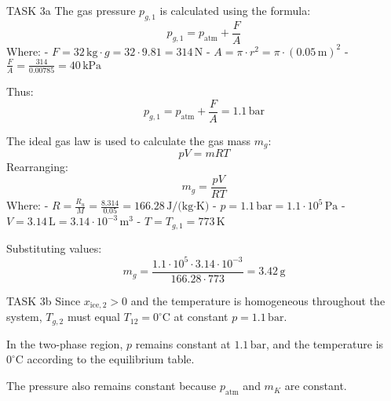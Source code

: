 TASK 3a  
The gas pressure \( p_{g,1} \) is calculated using the formula:  
\[
p_{g,1} = p_{\text{atm}} + \frac{F}{A}
\]  
Where:  
- \( F = 32 \, \text{kg} \cdot g = 32 \cdot 9.81 = 314 \, \text{N} \)  
- \( A = \pi \cdot r^2 = \pi \cdot (0.05 \, \text{m})^2 \)  
- \( \frac{F}{A} = \frac{314}{0.00785} = 40 \, \text{kPa} \)  

Thus:  
\[
p_{g,1} = p_{\text{atm}} + \frac{F}{A} = 1.1 \, \text{bar}
\]  

The ideal gas law is used to calculate the gas mass \( m_g \):  
\[
p V = m R T
\]  
Rearranging:  
\[
m_g = \frac{p V}{R T}
\]  
Where:  
- \( R = \frac{R_u}{M} = \frac{8.314}{0.05} = 166.28 \, \text{J/(kg·K)} \)  
- \( p = 1.1 \, \text{bar} = 1.1 \cdot 10^5 \, \text{Pa} \)  
- \( V = 3.14 \, \text{L} = 3.14 \cdot 10^{-3} \, \text{m}^3 \)  
- \( T = T_{g,1} = 773 \, \text{K} \)  

Substituting values:  
\[
m_g = \frac{1.1 \cdot 10^5 \cdot 3.14 \cdot 10^{-3}}{166.28 \cdot 773} = 3.42 \, \text{g}
\]  

TASK 3b  
Since \( x_{\text{ice},2} > 0 \) and the temperature is homogeneous throughout the system, \( T_{g,2} \) must equal \( T_{12} = 0^\circ\text{C} \) at constant \( p = 1.1 \, \text{bar} \).  

In the two-phase region, \( p \) remains constant at \( 1.1 \, \text{bar} \), and the temperature is \( 0^\circ\text{C} \) according to the equilibrium table.  

The pressure also remains constant because \( p_{\text{atm}} \) and \( m_K \) are constant.